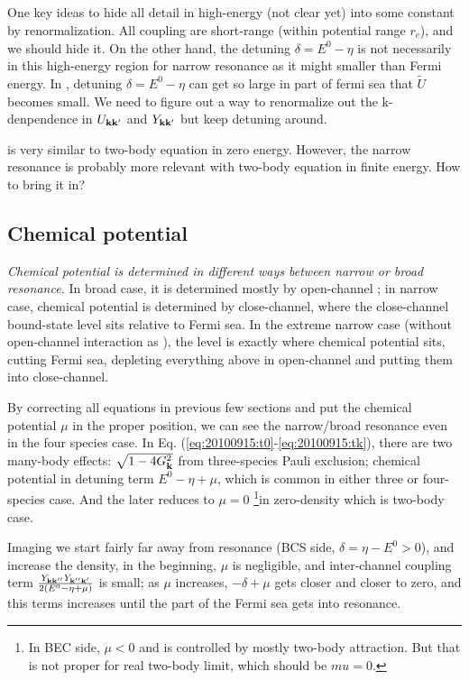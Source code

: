 \subsection{}
One key ideas to hide all detail in high-energy (not clear yet) into some constant by renormalization.  All coupling are short-range (within potential range $r_{c}$), and we should hide it.  On the other hand, the detuning $\delta=E^{0}-\eta$ is not necessarily in this high-energy region for narrow resonance as it might smaller than Fermi energy.  In , detuning $\delta=E^{0}-\eta$ can get so large in part of fermi sea that $\tilde{U}$ becomes small.  We need to figure out a way to renormalize out the k-denpendence in $U_{\mathbf{k}\mathbf{k}'}$ and $Y_{\mathbf{k}\mathbf{k}'}$ but keep detuning around.  

 is very similar to two-body \sch equation in zero energy.  However, the narrow resonance is probably more relevant with two-body \sch equation in finite energy.  How to bring it in?

\subsection{Chemical potential}
\emph{Chemical potential is determined in different ways between narrow or broad resonance.  }In broad case, it is determined mostly by open-channel ; in narrow case, chemical potential is determined by close-channel, where the close-channel bound-state level sits relative to Fermi sea.  In the extreme narrow case (without open-channel interaction as \cite{GurarieNarrow}), the level is exactly where chemical potential sits, cutting Fermi sea, depleting everything above in open-channel and putting them into close-channel.   

By correcting all equations in previous few sections and put the chemical potential $\mu$ in the proper position, we can see the narrow/broad resonance even in the four species case.  In Eq. (\ref{eq:20100915:t0}-\ref{eq:20100915:tk}), there are two many-body effects: $\sqrt{1-4G_{\mathbf{k}}^{2}}$ from three-species Pauli exclusion; chemical potential in detuning term $E^{0}-\eta+\mu$, which is common in either three or four-species case.  And the later reduces to $\mu=0$ \footnote{In BEC side, $\mu<0$ and is controlled by mostly two-body attraction.  But that is not proper for real two-body limit, which should be $mu=0$.}in zero-density which is two-body case. 

Imaging we start fairly far away from resonance (BCS side, $\delta=\eta-E^{0}>0$), and increase the density, in the beginning, $\mu$ is negligible, and inter-channel coupling term $\frac{Y_{\mathbf{k}\mathbf{k}''}Y_{\mathbf{k}''\mathbf{k}'}}{2(E^{0}-\eta+\mu)} $ is small; as $\mu$  increases, $-\delta+\mu$ gets closer and closer to zero, and this terms increases until the part of the Fermi sea gets into resonance.  